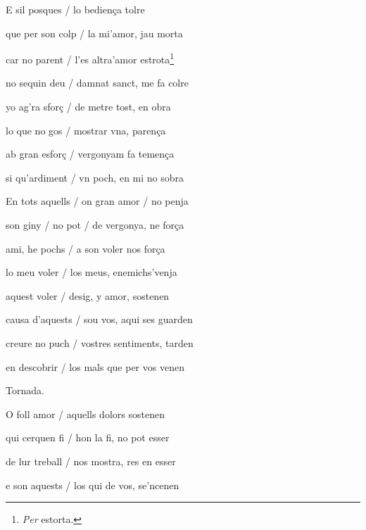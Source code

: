 \documentclass[12pt]{article}
\begin{document}
\begin{estrofa}

 E sil posques / lo bedien\c{c}a tolre

 que per son colp / la mi'amor, jau morta

 car no parent / l'es altra'amor estrota\footnote{\textit{Per }estorta.}

 no sequin deu / damnat sanct, me fa colre

 yo ag'ra sfor\c{c} / de metre tost, en obra

 lo que no gos / mostrar vna, paren\c{c}a

 ab gran esfor\c{c} / vergonyam fa temen\c{c}a

 si qu'ardiment / vn poch, en mi no sobra

\end{estrofa}



\begin{estrofa}

 En tots  aquells / on gran amor / no penja

 son giny / no pot / de vergonya, ne for\c{c}a

 ami, he pochs / a son voler nos for\c{c}a

 lo meu voler / los meus, enemichs'venja

 aquest voler / desig, y amor, sostenen

 causa d'aquests / sou vos, aqui ses guarden

 creure no puch / vostres sentiments, tarden

 en descobrir / los mals que per vos venen

\end{estrofa}


\begin{estrofaExtra}%




\begin{tornada}

Tornada.

\end{tornada}


\end{estrofaExtra}


\begin{estrofa}

 O foll amor / aquells dolors sostenen

 qui cerquen fi / hon la fi, no pot esser

 de lur treball / nos mostra, res en esser

 e son aquests / los qui de vos, se'ncenen

\end{estrofa}
\end{document}
